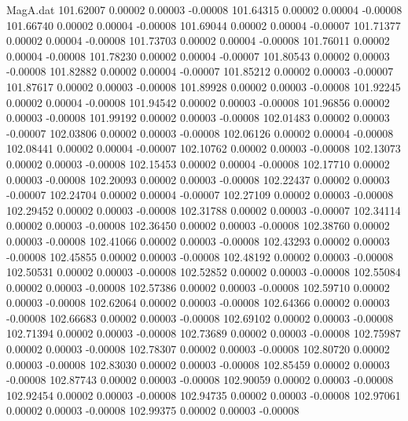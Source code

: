 \begin{filecontents}{MagA.dat}
 101.62007    0.00002    0.00003   -0.00008
 101.64315    0.00002    0.00004   -0.00008
 101.66740    0.00002    0.00004   -0.00008
 101.69044    0.00002    0.00004   -0.00007
 101.71377    0.00002    0.00004   -0.00008
 101.73703    0.00002    0.00004   -0.00008
 101.76011    0.00002    0.00004   -0.00008
 101.78230    0.00002    0.00004   -0.00007
 101.80543    0.00002    0.00003   -0.00008
 101.82882    0.00002    0.00004   -0.00007
 101.85212    0.00002    0.00003   -0.00007
 101.87617    0.00002    0.00003   -0.00008
 101.89928    0.00002    0.00003   -0.00008
 101.92245    0.00002    0.00004   -0.00008
 101.94542    0.00002    0.00003   -0.00008
 101.96856    0.00002    0.00003   -0.00008
 101.99192    0.00002    0.00003   -0.00008
 102.01483    0.00002    0.00003   -0.00007
 102.03806    0.00002    0.00003   -0.00008
 102.06126    0.00002    0.00004   -0.00008
 102.08441    0.00002    0.00004   -0.00007
 102.10762    0.00002    0.00003   -0.00008
 102.13073    0.00002    0.00003   -0.00008
 102.15453    0.00002    0.00004   -0.00008
 102.17710    0.00002    0.00003   -0.00008
 102.20093    0.00002    0.00003   -0.00008
 102.22437    0.00002    0.00003   -0.00007
 102.24704    0.00002    0.00004   -0.00007
 102.27109    0.00002    0.00003   -0.00008
 102.29452    0.00002    0.00003   -0.00008
 102.31788    0.00002    0.00003   -0.00007
 102.34114    0.00002    0.00003   -0.00008
 102.36450    0.00002    0.00003   -0.00008
 102.38760    0.00002    0.00003   -0.00008
 102.41066    0.00002    0.00003   -0.00008
 102.43293    0.00002    0.00003   -0.00008
 102.45855    0.00002    0.00003   -0.00008
 102.48192    0.00002    0.00003   -0.00008
 102.50531    0.00002    0.00003   -0.00008
 102.52852    0.00002    0.00003   -0.00008
 102.55084    0.00002    0.00003   -0.00008
 102.57386    0.00002    0.00003   -0.00008
 102.59710    0.00002    0.00003   -0.00008
 102.62064    0.00002    0.00003   -0.00008
 102.64366    0.00002    0.00003   -0.00008
 102.66683    0.00002    0.00003   -0.00008
 102.69102    0.00002    0.00003   -0.00008
 102.71394    0.00002    0.00003   -0.00008
 102.73689    0.00002    0.00003   -0.00008
 102.75987    0.00002    0.00003   -0.00008
 102.78307    0.00002    0.00003   -0.00008
 102.80720    0.00002    0.00003   -0.00008
 102.83030    0.00002    0.00003   -0.00008
 102.85459    0.00002    0.00003   -0.00008
 102.87743    0.00002    0.00003   -0.00008
 102.90059    0.00002    0.00003   -0.00008
 102.92454    0.00002    0.00003   -0.00008
 102.94735    0.00002    0.00003   -0.00008
 102.97061    0.00002    0.00003   -0.00008
 102.99375    0.00002    0.00003   -0.00008

\end{filecontents}
